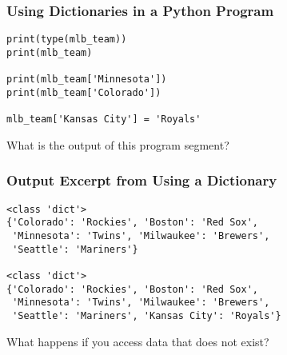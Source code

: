 \documentclass[14pt,aspectratio=169]{beamer}
\begin{document}
%
\begin{frame}[fragile]
  \frametitle{Using Dictionaries in a Python Program}
  \hspace*{.1in}
  \begin{minipage}{6in}
    \vspace*{.25in}
    \begin{verbatim}
print(type(mlb_team))
print(mlb_team)

print(mlb_team['Minnesota'])
print(mlb_team['Colorado'])

mlb_team['Kansas City'] = 'Royals'
    \end{verbatim}
  \end{minipage}
  \vspace*{.025in}
  \begin{center}
    \normalsize \noindent What is the output of this program segment? \\
  \end{center}
\end{frame}

%
\begin{frame}[fragile]
  \frametitle{Output Excerpt from Using a Dictionary}
  \begin{minipage}{6in}
    \vspace*{.25in}
    \begin{verbatim}
<class 'dict'>
{'Colorado': 'Rockies', 'Boston': 'Red Sox',
 'Minnesota': 'Twins', 'Milwaukee': 'Brewers',
 'Seattle': 'Mariners'}

<class 'dict'>
{'Colorado': 'Rockies', 'Boston': 'Red Sox',
 'Minnesota': 'Twins', 'Milwaukee': 'Brewers',
 'Seattle': 'Mariners', 'Kansas City': 'Royals'}
    \end{verbatim}
  \end{minipage}
  \vspace*{.025in}
  \begin{center}
    \normalsize \noindent What happens if you access data that does not exist? \\
  \end{center}
\end{frame}
\end{document}
